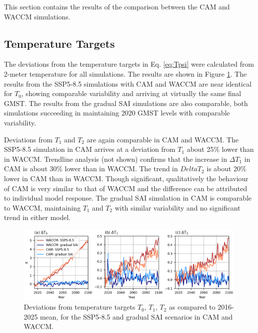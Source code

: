 This section contains the results of the comparison between the CAM and WACCM simulations. 

\subsection{Temperature Targets}
The deviations from the temperature targets in Eq. \ref{eq:Tpsi} were calculated from 2-meter temperature for all simulations. The results are shown in Figure \ref{fig:Tgrad1}. The results from the SSP5-8.5 simulations with CAM and WACCM are near identical for $T_0$, showing comparable variability and arriving at virtually the same final GMST. The results from the gradual SAI simulations are also comparable, both simulations succeeding in maintaining 2020 GMST levels with comparable variability. 

Deviations from $T_1$ and $T_2$ are again comparable in CAM and WACCM. The SSP5-8.5 simulation in CAM arrives at a deviation from $T_1$ about 25\% lower than in WACCM. Trendline analysis (not shown) confirms that the increase in $\Delta T_1$ in CAM is about 30\% lower than in WACCM. The trend in $Delta T_2$ is about 20\% lower in CAM than in WACCM. Though significant, qualitatively the behaviour of CAM is very similar to that of WACCM and the difference can be attributed to individual model response. The gradual SAI simulation in CAM is  comparable to WACCM, maintaining $T_1$ and $T_2$ with similar variability and no significant trend in either model.




\begin{figure}[H]
	\centering
	\includegraphics[width=0.95\linewidth]{images/Tgrad_v.png}
	\caption{Deviations from temperature targets $T_0$, $T_1$, $T_2$ as compared to 2016-2025 mean, for the SSP5-8.5 and gradual SAI scenarios in CAM and WACCM.}
	\label{fig:Tgrad1}
\end{figure}


